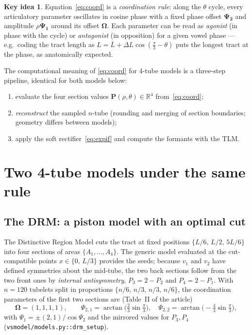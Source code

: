 \documentclass[11pt]{article}
\newcommand{\code}[1]{\texttt{#1}}
\theoremstyle{definition}
\newtheorem{keyidea}{Key idea}
\theoremstyle{remark}
\begin{document}
\begin{keyidea}
Equation~\eqref{eq:coord} is a \emph{coordination rule}: along the
$\theta$ cycle, every articulatory parameter oscillates in cosine phase
with a fixed phase offset $\bm{\Psi_2}$ and amplitude $\rho\bm{\Psi_1}$
around its offset $\bm{\Omega}$.  Each parameter can be read as
\emph{agonist} (in phase with the cycle) or \emph{antagonist} (in
opposition) for a given vowel phase --- e.g.\ coding the tract length as
$L=\overline L+\Delta L\cos(\frac{\pi}{3}-\theta)$ puts the longest
tract at the \textipa{[u]} phase, as anatomically expected.
\end{keyidea}

The computational meaning of \eqref{eq:coord} for 4-tube models is a
three-step pipeline, identical for both models below:
\begin{enumerate}[nosep]
\item evaluate the four section values
      $\bm{P}(\rho,\theta)\in\mathbb{R}^4$ from~\eqref{eq:coord};
\item \emph{reconstruct} the sampled $n$-tube (rounding and merging of
      section boundaries; geometry differs between models);
\item apply the soft rectifier~\eqref{eq:expif} and compute the formants
      with the TLM.
\end{enumerate}

\section{Two 4-tube models under the same rule}

\subsection{The DRM: a piston model with an optimal cut}

The Distinctive Region Model \citep{Mrayati1988} cuts the tract at fixed
positions $\{L/6,\,L/2,\,5L/6\}$ into four sections of areas
$\{A_1,\dots,A_4\}$.  The generic model evaluated at the cut-compatible
points $x\in\{0,\,L/3\}$ provides the seeds; because $v_1$ and $v_2$ have
defined symmetries about the mid-tube, the two back sections follow from
the two front ones by \emph{internal antisymmetry},
$P_3=2-P_2$ and $P_4=2-P_1$.  With $n=120$ tubelets split in proportions
$\{n/6,\,n/3,\,n/3,\,n/6\}$, the coordination parameters of the first two
sections are (Table~II of the article)
\begin{equation}
\bm{\Omega}=(1,1,1,1),\qquad
\Psi_{2,1}=\arctan\big(\tfrac23\sin\tfrac{\pi}{3}\big),\quad
\Psi_{2,2}=\arctan\big(-\tfrac43\sin\tfrac{\pi}{3}\big),
\end{equation}
with $\Psi_1=\pm(2,1)/\cos\Psi_2$ and the mirrored values for $P_3,P_4$
(\code{vsmodel/models.py::drm\_setup}).
\end{document}
